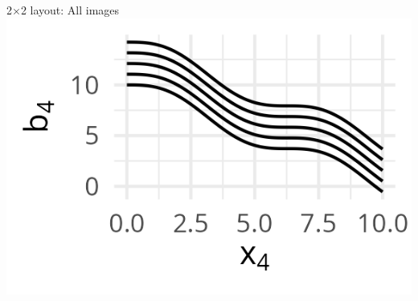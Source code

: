 \documentclass[11pt,compress,t,notes=noshow, xcolor=table]{beamer}
\begin{document}
\begin{frame}{2$\times$2 layout: All images}
{  }{%
  \includegraphics[width=\textwidth]{figure/boosting-cwb-blpool4.png}
  }
\end{frame}


\end{document}
